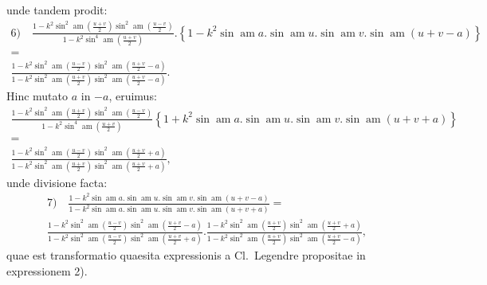 \documentclass{article}
\begin{document}
unde tandem prodit:
\[
\begin{gathered}
\text{6)}\quad \frac{1-k^{2}\sin^{2}\operatorname{am}\left(\frac{u+v}{2}\right)\sin^{2}\operatorname{am}\left(\frac{u-v}{2}\right)}{1-k^{2}\sin^{4}\operatorname{am}\left(\frac{u+v}{2}\right)}.\left\{1-k^{2}\sin\operatorname{am}a.\sin\operatorname{am}u.\sin\operatorname{am}v.\sin\operatorname{am}(u+v-a)\right\}\\[1.5ex]
=\\[1.5ex]
\frac{1-k^{2}\sin^{2}\operatorname{am}\left(\frac{u-v}{2}\right)\sin^{2}\operatorname{am}\left(\frac{u+v}{2}-a\right)}{1-k^{2}\sin^{2}\operatorname{am}\left(\frac{u+v}{2}\right)\sin^{2}\operatorname{am}\left(\frac{u+v}{2}-a\right)}.
\end{gathered}
\]
Hinc mutato $a$ in $-a$, eruimus:
\[
\begin{gathered}
\frac{1-k^{2}\sin^{2}\operatorname{am}\left(\frac{u+v}{2}\right)\sin^{2}\operatorname{am}\left(\frac{u-v}{2}\right)}{1-k^{2}\sin^{4}\operatorname{am}\left(\frac{u+v}{2}\right)}\left\{1+k^{2}\sin\operatorname{am}a.\sin\operatorname{am}u.\sin\operatorname{am}v.\sin\operatorname{am}(u+v+a)\right\}\\[1.5ex]
=\\[1.5ex]
\frac{1-k^{2}\sin^{2}\operatorname{am}\left(\frac{u-v}{2}\right)\sin^{2}\operatorname{am}\left(\frac{u+v}{2}+a\right)}{1-k^{2}\sin^{2}\operatorname{am}\left(\frac{u+v}{2}\right)\sin^{2}\operatorname{am}\left(\frac{u+v}{2}+a\right)},
\end{gathered}
\]
unde divisione facta:
\[
\begin{gathered}
\text{7)}\quad \frac{1-k^{2}\sin\operatorname{am}a.\sin\operatorname{am}u.\sin\operatorname{am}v.\sin\operatorname{am}(u+v-a)}{1-k^{2}\sin\operatorname{am}a.\sin\operatorname{am}u.\sin\operatorname{am}v.\sin\operatorname{am}(u+v+a)}=\\[1.5ex]
\frac{1-k^{2}\sin^{2}\operatorname{am}\left(\frac{u-v}{2}\right)\sin^{2}\operatorname{am}\left(\frac{u+v}{2}-a\right)}{1-k^{2}\sin^{2}\operatorname{am}\left(\frac{u-v}{2}\right)\sin^{2}\operatorname{am}\left(\frac{u+v}{2}+a\right)}.\frac{1-k^{2}\sin^{2}\operatorname{am}\left(\frac{u+v}{2}\right)\sin^{2}\operatorname{am}\left(\frac{u+v}{2}+a\right)}{1-k^{2}\sin^{2}\operatorname{am}\left(\frac{u+v}{2}\right)\sin^{2}\operatorname{am}\left(\frac{u+v}{2}-a\right)},
\end{gathered}
\]
quae est transformatio quaesita expressionis a Cl.\ Legendre propositae in expressionem 2).
\end{document}
